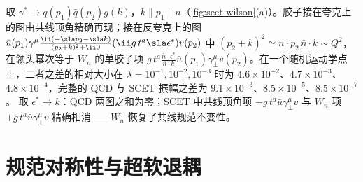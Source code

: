 \begin{example}[$W_n$ 的树图匹配]\label{ex:scet-wn-tree}
取 $\gamma^*\to q(p_1)\bar q(p_2)g(k)$，$k\parallel p_1\parallel n$（\cref{fig:scet-wilson}(a)）。胶子接在夸克上的图由共线顶角精确再现；接在反夸克上的图 $\bar u(p_1)\gamma^\mu\frac{\ii(-\sla p_2-\sla k)}{(p_2+k)^2+\ii0}(\ii g\,t^a\sla\epsilon^*)v(p_2)$ 中 $(p_2+k)^2\simeq n\cdot p_2\,\bar n\cdot k\sim Q^2$，在领头幂次等于 $W_n$ 的单胶子项 $g\,t^a\frac{\bar n\cdot\epsilon^*}{\bar n\cdot k}\bar u(p_1)\gamma_\perp^\mu v(p_2)$。在一个随机运动学点上，二者之差的相对大小在 $\lambda=10^{-1},10^{-2},10^{-3}$ 时为 $4.6\times10^{-2}$、$4.7\times10^{-3}$、$4.8\times10^{-4}$，完整的 QCD 与 SCET 振幅之差为 $9.1\times10^{-3}$、$8.5\times10^{-5}$、$8.5\times10^{-7}$。%
取 $\epsilon^*\to k$：QCD 两图之和为零；SCET 中共线顶角项 $-g\,t^a\bar u\gamma_\perp^\mu v$ 与 $W_n$ 项 $+g\,t^a\bar u\gamma_\perp^\mu v$ 精确相消——$W_n$ 恢复了共线规范不变性。
\end{example}

\section{规范对称性与超软退耦}\label{sec:scet-decoupling}


